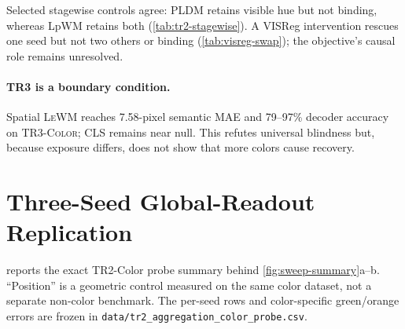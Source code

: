 \documentclass{article}
\newcommand{\trthree}{\textsc{TR3-Color}}
\newcommand{\lewm}{\textsc{LeWM}}
\begin{document}
Selected stagewise controls agree: PLDM retains visible hue but not binding,
whereas LpWM retains both (\cref{tab:tr2-stagewise}).  A VISReg intervention
rescues one seed but not two others or binding (\cref{tab:visreg-swap}); the
objective's causal role remains unresolved.

\paragraph{TR3 is a boundary condition.}
Spatial \lewm{} reaches 7.58-pixel semantic MAE and 79--97\% decoder accuracy
on \trthree{}; CLS remains near null.  This refutes universal blindness but,
because exposure differs, does not show that more colors cause recovery.

\clearpage



\clearpage
\appendix

\section{Three-Seed Global-Readout Replication}

 reports the exact TR2-Color probe summary
behind \cref{fig:sweep-summary}a--b.  ``Position'' is a geometric control
measured on the same color dataset, not a separate non-color benchmark.  The
per-seed rows and color-specific green/orange errors are frozen in
\texttt{data/tr2\_aggregation\_color\_probe.csv}.
\end{document}
